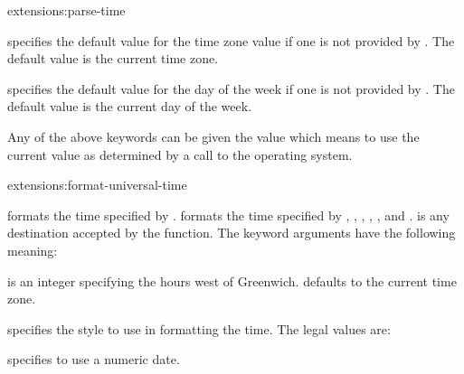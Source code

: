 \begin{defun}{extensions:}{parse-time}
\begin{Lentry}
  \item[\kwd{default-zone}] specifies the default value for the time
    zone value if one is not provided by .  The
    default value is the current time zone.
    
  \item[\kwd{default-weekday}] specifies the default value for the day
    of the week if one is not provided by .  The
    default value is the current day of the week.
  \end{Lentry}
  Any of the above keywords can be given the value  which
  means to use the current value as determined by a call to the
  operating system.
\end{defun}

\begin{defun}{extensions:}{format-universal-time}{
    }
   
    formats the time specified by
   .   formats the time
   specified by , , , ,
   , and .   is any destination
   accepted by the  function.  The keyword arguments have
   the following meaning:
   \begin{Lentry}
     
   \item[\kwd{timezone}] is an integer specifying the hours west of
     Greenwich.   defaults to the current time zone.
     
   \item[\kwd{style}] specifies the style to use in formatting the
     time.  The legal values are:
     \begin{Lentry}
  
     \item[\kwd{short}] specifies to use a numeric date.
  

\end{Lentry}
\end{Lentry}
\end{defun}
